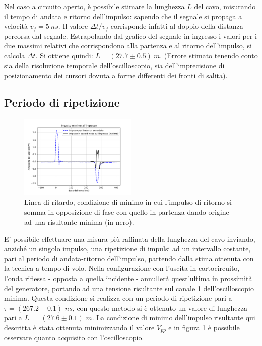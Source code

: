 \documentclass[journal]{IEEEtran}
\begin{document}
Nel caso a circuito aperto, è possibile stimare la lunghezza $L$ del cavo, misurando il tempo di andata e ritorno dell'impulso: sapendo che il segnale si propaga a velocità $v_f = 5 \ ns$. Il valore $\Delta t / {v_f}$ corrisponde infatti al doppio della distanza percorsa dal segnale. 
Estrapolando dal grafico del segnale in ingresso i valori per i due massimi relativi che corrispondono alla partenza e al ritorno dell'impulso, si calcola $\Delta t$. Si ottiene quindi: 
$L = (27.7 \pm 0.5) \ m $. (Errore stimato tenendo conto sia della risoluzione temporale dell'oscilloscopio, sia dell'imprecisione di posizionamento dei cursori dovuta a forme differenti dei fronti di salita).


\subsection{\textbf{Periodo di ripetizione}}

\begin{figure}[H]%
\begin{center}
\includegraphics[width=0.5\textwidth]{analysis/output/Delay_line_repetition.pdf}
\caption{Linea di ritardo, condizione di minimo in cui l'impulso di ritorno si somma in opposizione di fase con quello in partenza dando origine ad una risultante minima (in nero).}
\label{fig: ripetizione di impulsi}
\end{center}
\end{figure}


E' possibile effettuare una misura più raffinata della lunghezza del cavo inviando, anziché un singolo impulso, una ripetizione di impulsi ad un intervallo costante, pari al periodo di andata-ritorno dell'impulso, partendo dalla stima ottenuta con la tecnica a tempo di volo. Nella configurazione con l'uscita in cortocircuito, l'onda riflessa - opposta a quella incidente - annullerà quest'ultima in prossimità del generatore, portando ad una tensione risultante sul canale 1 dell'oscilloscopio minima. Questa condizione si realizza con un periodo di ripetizione pari a $\tau = (267.2 \pm 0.1)$ $ns$, con questo metodo si è ottenuto un valore di lunghezza pari a $ L = $ $(27.6 \pm 0.1)$ $m $. La condizione di minimo dell'impulso risultante qui descritta è stata ottenuta minimizzando il valore $V_{pp}$ e in figura \ref{fig: ripetizione di impulsi} è possibile osservare quanto acquisito con l'oscilloscopio.
\end{document}
